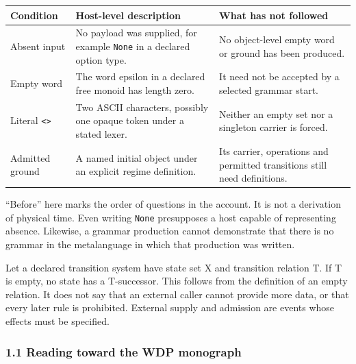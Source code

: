 \documentclass[
  11pt,
]{article}
\begin{document}
\begin{longtable}[]{@{}
  >{\raggedright\arraybackslash}p{}
  >{\raggedright\arraybackslash}p{}
  >{\raggedright\arraybackslash}p{}@{}}
\toprule\noalign{}
\begin{minipage}[b]{\linewidth}\raggedright
Condition
\end{minipage} & \begin{minipage}[b]{\linewidth}\raggedright
Host-level description
\end{minipage} & \begin{minipage}[b]{\linewidth}\raggedright
What has not followed
\end{minipage} \\
\midrule\noalign{}
\endhead
\bottomrule\noalign{}
\endlastfoot
Absent input & No payload was supplied, for example \nolinkurl{None} in a
declared option type. & No object-level empty word or ground has been
produced. \\
Empty word & The word epsilon in a declared free monoid has length zero.
& It need not be accepted by a selected grammar start. \\
Literal \texttt{\textless{}\textgreater{}} & Two ASCII characters,
possibly one opaque token under a stated lexer. & Neither an empty set
nor a singleton carrier is forced. \\
Admitted ground & A named initial object under an explicit regime
definition. & Its carrier, operations and permitted transitions still
need definitions. \\
\end{longtable}

``Before'' here marks the order of questions in the account. It is not a
derivation of physical time. Even writing \nolinkurl{None} presupposes a
host capable of representing absence. Likewise, a grammar production
cannot demonstrate that there is no grammar in the metalanguage in which
that production was written.

Let a declared transition system have state set X and transition
relation T. If T is empty, no state has a T-successor. This follows from
the definition of an empty relation. It does not say that an external
caller cannot provide more data, or that every later rule is prohibited.
External supply and admission are events whose effects must be
specified.

\subsubsection{1.1 Reading toward the WDP
monograph}\label{reading-toward-the-wdp-monograph}
\end{document}
